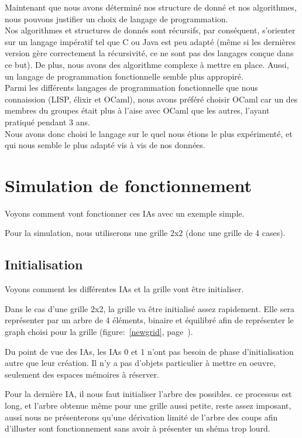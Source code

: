 \documentclass[a4paper,12pt]{report}
\begin{document}
Maintenant que nous avons d\'etermin\'e nos structure de donn\'e et nos algorithmes, nous pouvons justifier un choix de langage de programmation. \\
Nos algorithmes et structures de donn\'es sont r\'ecursifs, par cons\'equent, s'orienter sur un langage imp\'eratif tel que C ou Java est peu adapt\'e (m\^eme si les derni\`eres version g\`ere correctement la r\'ecursivit\'e, ce ne sont pas des langages con\c{c}ue dans ce but). De plus, nous avons des algorithme complexe \`a mettre en place. Aussi, un langage de programmation fonctionnelle semble plus appropir\'e. \\
Parmi les diff\'erents langages de programmation fonctionnelle que nous connaission (LISP, \'elixir et OCaml), nous avons pr\'ef\'er\'e choisir OCaml car un des membres du groupes \'etait plus \`a l'aise avec OCaml que les autres, l'ayant pratiqu\'e pendant 3 ans. \\
Nous avons donc choisi le langage sur le quel nous \'etions le plus exp\'eriment\'e, et qui nous semble le plus adapt\'e vis \`a vis de nos donn\'ees.

\part{Simulation de fonctionnement}

Voyons comment vont fonctionner ces IAs avec un exemple simple. 


Pour la simulation, nous utiliserons une grille 2x2 (donc une grille de 4 cases). 

\chapter{Initialisation}

Voyons comment les diff\'erentes IAs et la grille vont \^etre initialiser. 

Dans le cas d'une grille 2x2, la grille va \^etre initialis\'e assez rapidement. Elle sera repr\'esenter par un arbre de 4 \'el\'ements, binaire et \'equilibr\'e afin de repr\'esenter le graph choisi pour la grille (figure:~\autoref{newgrid}, page~\pageref{newgrid}).

Du point de vue des IAs, les IAs 0 et 1 n'ont pas besoin de phase d'initialisation autre que leur cr\'eation. Il n'y a pas d'objets particulier \`a mettre en oeuvre, seulement des espaces m\'emoires \`a r\'eserver. 

Pour la derni\`ere IA, il nous faut initialiser l'arbre des possibles. ce processus est long, et l'arbre obtenue m\^eme pour une grille aussi petite, reste assez imposant, aussi nous ne pr\'esenterons qu'une d\'erivation limit\'e de l'arbre des coups afin d'illuster sont fonctionnement sans avoir \`a pr\'esenter un sh\'ema trop lourd.
\end{document}
